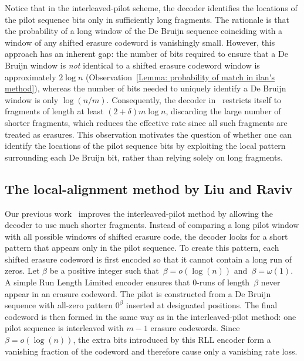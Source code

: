 \documentclass[journal,letterpaper,onecolumn,11pt]{IEEEtran}
\begin{document}
Notice that in the interleaved-pilot scheme, the decoder identifies the locations of the pilot sequence bits only in sufficiently long fragments. 
The rationale is that the probability of a long window of the De Bruijn sequence coinciding with a window of any shifted erasure codeword is vanishingly small. 
However, this approach has an inherent gap: the number of bits required to ensure that a De Bruijn window is \emph{not} identical to a shifted erasure codeword window is approximately  $2\log n$ (Observation~\ref{Lemma: probability of match in ilan's method}), whereas the number of bits needed to uniquely identify a De Bruijn window is only $\log (n/m)$. 
Consequently, the decoder in~\cite{shomorony2021torn} restricts itself to fragments of length at least $(2+\delta)m\log n$, discarding the large number of shorter fragments, which reduces the effective rate since all such fragments are treated as erasures.
This observation motivates the question of whether one can identify the locations of the pilot sequence bits by exploiting the local pattern surrounding each De Bruijn bit, rather than relying solely on long fragments. 

\subsection{The local-alignment method by Liu and Raviv}\label{section:previous-local-alignment}

Our previous work~\cite{liu2026improved} improves the interleaved-pilot method by allowing the decoder to use much shorter fragments. 
Instead of comparing a long pilot window with all possible windows of shifted erasure code, the decoder looks for a short pattern that appears only in the pilot sequence.
To create this pattern, each shifted erasure codeword is first encoded so that it cannot contain a long run of zeros. 
Let $\beta$ be a positive integer such that~$\beta=o(\log(n))$ and~$\beta=\omega(1)$.
A simple Run Length Limited encoder ensures that $0$-runs of length~$\beta$ never appear in an erasure codeword.
The pilot is constructed from a De Bruijn sequence with all-zero pattern $0^\beta$ inserted at designated positions.
The final codeword is then formed in the same way as in the interleaved-pilot method: one pilot sequence is interleaved with $m-1$ erasure codewords.
Since $\beta=o(\log(n))$, the extra bits introduced by this RLL encoder form a vanishing fraction of the codeword and therefore cause only a vanishing rate loss.
\end{document}
